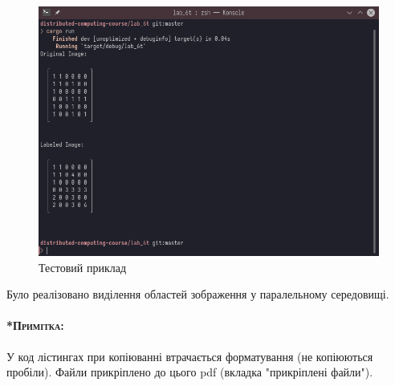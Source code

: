 \documentclass{udstu}
\begin{document}
\begin{figure}[!htp]
	\centering
	\includegraphics[scale=0.75]{PNG/test-case.png}
	\caption{Тестовий приклад}
	\label{fig:figure1}
\end{figure}

\conclusions

Було реалізовано виділення областей зображення у паралельному середовищі.


\paragraph{\textsc{*Примітка:}}
У код лістингах при копіюванні втрачається форматування (не копіюються пробіли).
Файли прикріплено до цього pdf (вкладка "прикріплені файли").

\inputminted{rust}{../src/main.rs}
\end{document}
